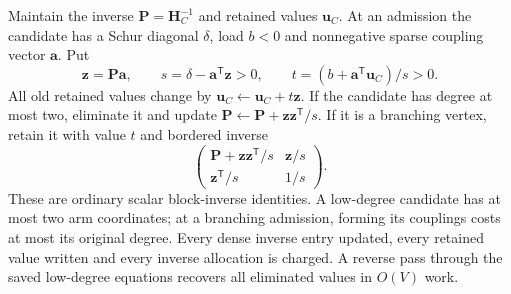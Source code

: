 Maintain the inverse $\bm P=\bm H_C^{-1}$ and retained values $\bm u_C$.
At an admission the candidate has a Schur diagonal $\delta$, load $b<0$
and nonnegative sparse coupling vector $\bm a$. Put
\begin{equation}
 \bm z=\bm P\bm a,\qquad s=\delta-\bm a^{\mathsf T}\bm z>0,
 \qquad t=(b+\bm a^{\mathsf T}\bm u_C)/s>0.
 \label{eq:op3-core-rank-update}
\end{equation}
All old retained values change by $\bm u_C\leftarrow\bm u_C+t\bm z$.
If the candidate has degree at most two, eliminate it and update
$\bm P\leftarrow\bm P+\bm z\bm z^{\mathsf T}/s$.
If it is a branching vertex, retain it with value $t$ and bordered inverse
\[
 \begin{pmatrix}
 \bm P+\bm z\bm z^{\mathsf T}/s&\bm z/s\\
 \bm z^{\mathsf T}/s&1/s
 \end{pmatrix}.
\]
These are ordinary scalar block-inverse identities. A low-degree candidate
has at most two arm coordinates; at a branching admission, forming its
couplings costs at most its original degree. Every dense inverse entry
updated, every retained value written and every inverse allocation is
charged. A reverse pass through the saved low-degree equations recovers
all eliminated values in $O(V)$ work.

